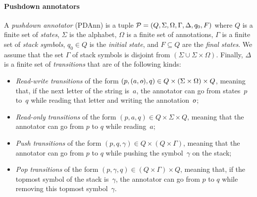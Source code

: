 \paragraph{Pushdown annotators} A \emph{pushdown annotator} (PDAnn) is a tuple
$\mathcal{P} = (Q, \Sigma, \Omega, \Gamma, \Delta, \allowbreak q_0, F)$ where $Q$ is a finite set of \emph{states},
%
%
$\Sigma$ is the alphabet, $\Omega$ is a finite set of annotations, $\Gamma$ is a finite set of \emph{stack symbols}, $q_0 \in Q$ is the \emph{initial state}, and $F \subseteq Q$ are the \emph{final states}. We assume that the set $\Gamma$ of stack symbols is disjoint from $(\Sigma \cup \Sigma\times \Omega)$. Finally, $\Delta$ is a finite set of \emph{transitions} that are of the following kinds:
%
\begin{itemize}
	\item {\em Read-write transitions} of the form $(p, (a, \oout), q) \in Q\times(\Sigma\times \Omega)\times Q$, meaning that, if the next letter of the string is~$a$, the annotator can go from states~$p$ to~$q$ while reading that letter and writing the annotation~$\oout$;
	\item {\em Read-only transitions} of the form $(p, a, q) \in
          Q\times\Sigma\times Q$, meaning that the annotator can go from $p$ to
          $q$ while reading~$a$;
	\item {\em Push transitions} of the form $(p, q, \gamma) \in Q\times (Q\times\Gamma)$, meaning that the annotator can go from $p$ to $q$ while pushing the symbol~$\gamma$ on the stack;
	\item {\em Pop transitions} of the form $(p, \gamma, q) \in (Q\times \Gamma)\times Q$, meaning that, if the topmost symbol of the stack is~$\gamma$, the annotator can go from $p$ to $q$ while removing this topmost symbol~$\gamma$.
\end{itemize}

%

